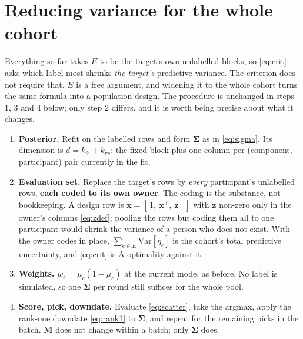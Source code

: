 \documentclass[11pt]{article}
\newcommand{\bx}{\bm{x}}
\newcommand{\bz}{\bm{z}}
\newcommand{\bS}{\bm{\Sigma}}
\newcommand{\bM}{\bm{M}}
\newcommand{\Var}{\mathrm{Var}}
\begin{document}
\section{Reducing variance for the whole cohort}
\label{sec:cohort}

Everything so far takes $E$ to be the target's own unlabelled blocks, so \eqref{eq:crit} asks
which label most shrinks \emph{the target's} predictive variance. The criterion does not require
that. $E$ is a free argument, and widening it to the whole cohort turns the same formula into a
population design. The procedure is unchanged in steps 1, 3 and 4 below; only step 2 differs,
and it is worth being precise about what it changes.

\begin{enumerate}
  \item\textbf{Posterior.} Refit on the labelled rows and form $\bS$ as in \eqref{eq:sigma}.
        Its dimension is $d = k_{\text{fe}} + k_{\text{vc}}$: the fixed block plus one column per
        (component, participant) pair currently in the fit.

  \item\textbf{Evaluation set.} Replace the target's rows by \emph{every} participant's
        unlabelled rows, \textbf{each coded to its own owner}. The coding is the substance, not
        bookkeeping. A design row is $\tilde{\bx} = [\,1,\ \bx^{\!\top},\ \bz^{\!\top}\,]$ with
        $\bz$ non-zero only in the owner's columns \eqref{eq:zdef}; pooling the rows but coding
        them all to one participant would shrink the variance of a person who does not exist.
        With the owner codes in place, $\sum_{e\in E}\Var[\eta_e]$ is the cohort's total
        predictive uncertainty, and \eqref{eq:crit} is A-optimality against it.

  \item\textbf{Weights.} $w_c = \mu_c(1-\mu_c)$ at the current mode, as before. No label is
        simulated, so one $\bS$ per round still suffices for the whole pool.

  \item\textbf{Score, pick, downdate.} Evaluate \eqref{eq:scatter}, take the argmax, apply the
        rank-one downdate \eqref{eq:rank1} to $\bS$, and repeat for the remaining picks in the
        batch. $\bM$ does not change within a batch; only $\bS$ does.
\end{enumerate}
\end{document}
